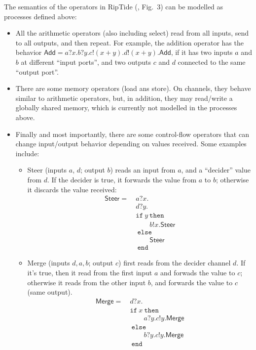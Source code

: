 \documentclass{article}
\theoremstyle{definition}
\newcommand{\ite}[3]{\texttt{if}\ #1\ \texttt{then}\ #2\ \texttt{else}\ #3\ \texttt{end}}
\begin{document}
The semantics of the operators in RipTide (\cite{riptide}, Fig.~3) can be modelled as processes defined above:
\begin{itemize}
    \item All the arithmetic operators (also including select) read from all inputs, send to all outputs, and then repeat. For example, the addition operator has the behavior $\mathsf{Add} = a?x. b?y. c!(x + y). d!(x + y). \mathsf{Add}$, if it has two inputs $a$ and $b$ at different ``input ports'', and two outputs $c$ and $d$ connected to the same ``output port''.
    \item There are some memory operators (load ans store). On channels, they behave similar to arithmetic operators, but, in addition, they may read/write a globally shared memory, which is currently not modelled in the processes above.
    \item Finally and most importantly, there are some control-flow operators that can change input/output behavior depending on values received. Some examples include:
    \begin{itemize}
        \item Steer (inputs $a$, $d$; output $b$) reads an input from $a$, and a ``decider'' value from $d$. If the decider is true, it forwards the value from $a$ to $b$; otherwise it discards the value received:
        \begin{align*}
            \mathsf{Steer} =&\ a?x. \\
                            &\ d?y. \\
                            &\ \ite{y}{\\
                            &\ \qquad b!x. \mathsf{Steer} \\
                            &\ }{ \\
                            &\ \qquad \mathsf{Steer} \\
                            &\ }
        \end{align*}
        
        \item Merge (inputs $d, a, b$; output $c$) first reads from the decider channel $d$. If it's true, then it read from the first input $a$ and forwads the value to $c$; otherwise it reads from the other input $b$, and forwards the value to $c$ (same output).
        \begin{align*}
            \mathsf{Merge} =&\ d?x. \\
                            &\ \ite{x}{\\
                            &\ \qquad a?y. c!y. \mathsf{Merge} \\
                            &\ }{ \\
                            &\ \qquad b?y. c!y. \mathsf{Merge} \\
                            &\ }
        \end{align*}


\end{itemize}
\end{itemize}
\end{document}
